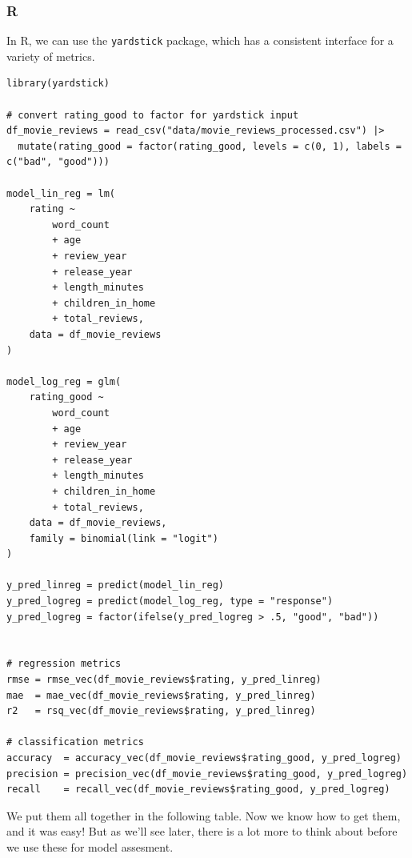 \documentclass[
  letterpaper,
]{krantz}
\begin{document}
\subsubsection{R}

In R, we can use the \texttt{yardstick} package, which has a consistent
interface for a variety of metrics.

\begin{verbatim}
library(yardstick)

# convert rating_good to factor for yardstick input
df_movie_reviews = read_csv("data/movie_reviews_processed.csv") |> 
  mutate(rating_good = factor(rating_good, levels = c(0, 1), labels = c("bad", "good")))

model_lin_reg = lm(
    rating ~
        word_count
        + age
        + review_year
        + release_year
        + length_minutes
        + children_in_home
        + total_reviews,
    data = df_movie_reviews
)

model_log_reg = glm(
    rating_good ~
        word_count
        + age
        + review_year
        + release_year
        + length_minutes
        + children_in_home
        + total_reviews,
    data = df_movie_reviews,
    family = binomial(link = "logit")
)

y_pred_linreg = predict(model_lin_reg)
y_pred_logreg = predict(model_log_reg, type = "response")
y_pred_logreg = factor(ifelse(y_pred_logreg > .5, "good", "bad"))


# regression metrics  
rmse = rmse_vec(df_movie_reviews$rating, y_pred_linreg)
mae  = mae_vec(df_movie_reviews$rating, y_pred_linreg)
r2   = rsq_vec(df_movie_reviews$rating, y_pred_linreg)

# classification metrics
accuracy  = accuracy_vec(df_movie_reviews$rating_good, y_pred_logreg)
precision = precision_vec(df_movie_reviews$rating_good, y_pred_logreg)
recall    = recall_vec(df_movie_reviews$rating_good, y_pred_logreg)
\end{verbatim}

We put them all together in the following table. Now we know how to get
them, and it was easy! But as we'll see later, there is a lot more to
think about before we use these for model assesment.
\end{document}
